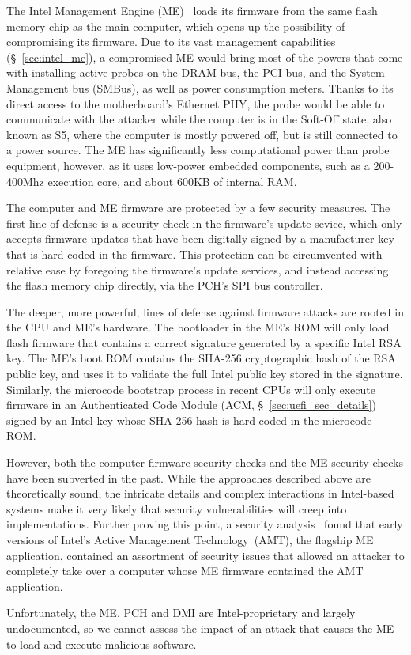 The Intel Management Engine (ME)~\cite{ruan2014intelme} loads its firmware
from the same flash memory chip as the main computer, which opens up the
possibility of compromising its firmware. Due to its vast management
capabilities (\S~\ref{sec:intel_me}), a compromised ME would bring most of the
powers that come with installing active probes on the DRAM bus, the PCI bus,
and the System Management bus (SMBus), as well as power consumption meters.
Thanks to its direct access to the motherboard's Ethernet PHY, the probe would
be able to communicate with the attacker while the computer is in the Soft-Off
state, also known as S5, where the computer is mostly powered off, but is still
connected to a power source.  The ME has significantly less computational power
than probe equipment, however, as it uses low-power embedded components, such
as a 200-400Mhz execution core, and about 600KB of internal RAM.

The computer and ME firmware are protected by a few security measures. The
first line of defense is a security check in the firmware's update sevice,
which only accepts firmware updates that have been digitally signed by a
manufacturer key that is hard-coded in the firmware. This protection can be
circumvented with relative ease by foregoing the firmware's update services,
and instead accessing the flash memory chip directly, via the PCH's SPI bus
controller.

The deeper, more powerful, lines of defense against firmware attacks are rooted
in the CPU and ME's hardware. The bootloader in the ME's ROM will only load
flash firmware that contains a correct signature generated by a specific Intel
RSA key. The ME's boot ROM contains the SHA-256 cryptographic hash of the RSA
public key, and uses it to validate the full Intel public key stored in the
signature. Similarly, the microcode bootstrap process in recent CPUs will only
execute firmware in an Authenticated Code Module
(ACM, \S~\ref{sec:uefi_sec_details}) signed by an Intel key whose SHA-256 hash
is hard-coded in the microcode ROM.

However, both the computer firmware security checks \cite{wojtczuk2010bios,
furtak2014bios} and the ME security checks \cite{tereshkin2009amt} have been
subverted in the past. While the approaches described above are theoretically
sound, the intricate details and complex interactions in Intel-based systems
make it very likely that security vulnerabilities will creep into
implementations. Further proving this point, a security
analysis~\cite{ververis2010security} found that early versions of Intel's
Active Management Technology~(AMT), the flagship ME application, contained an
assortment of security issues that allowed an attacker to completely take over
a computer whose ME firmware contained the AMT application.

Unfortunately, the ME, PCH and DMI are Intel-proprietary and largely
undocumented, so we cannot assess the impact of an attack that causes the ME
to load and execute malicious software.
